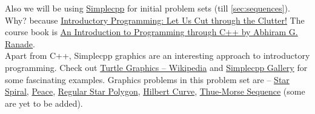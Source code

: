 Also we will be using \href{https://www.cse.iitb.ac.in/~ranade/simplecpp/}{Simplecpp} for initial problem sets (till \ref{sec:sequences}).
Why? because \href{https://www.cse.iitb.ac.in/~ranade/iticse16.pdf}{Introductory Programming: Let Us Cut through the Clutter!} The course book is \href{https://www.cse.iitb.ac.in/~ranade/book.html}{An Introduction to Programming through C++ by Abhiram G. Ranade}.\\
Apart from C++, Simplecpp graphics are an interesting approach to introductory programming. Check out \href{https://en.wikipedia.org/wiki/Turtle_graphics}{Turtle Graphics -- Wikipedia} and \href{https://www.cse.iitb.ac.in/~ranade/simplecpp/gallery.html}{Simplecpp Gallery} for some fascinating examples. Graphics problems in this problem set are -- \hyperref[pp:starspiral]{Star Spiral}, \hyperref[pp:peace]{Peace}, \hyperref[pp:regularstarpolygon]{Regular Star Polygon}, \hyperref[pp:hilbertcurve]{Hilbert Curve}, \hyperref[pp:thuemorsesequence]{Thue-Morse Sequence} (some are yet to be added).

